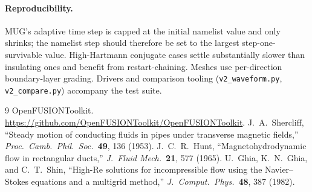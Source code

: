 \documentclass[11pt,letterpaper]{article}
\begin{document}
\paragraph{Reproducibility.} MUG's adaptive time step is capped at the initial
namelist value and only shrinks; the namelist step should therefore be set to the
largest step-one-survivable value. High-Hartmann conjugate cases settle
substantially slower than insulating ones and benefit from restart-chaining.
Meshes use per-direction boundary-layer grading. Drivers and comparison tooling
(\texttt{v2\_waveform.py}, \texttt{v2\_compare.py}) accompany the test suite.

\begin{thebibliography}{9}
 OpenFUSIONToolkit. \url{https://github.com/OpenFUSIONToolkit/OpenFUSIONToolkit}.
 J.~A.~Shercliff, ``Steady motion of conducting fluids in
pipes under transverse magnetic fields,'' \emph{Proc.\ Camb.\ Phil.\ Soc.}\ \textbf{49}, 136 (1953).
 J.~C.~R.~Hunt, ``Magnetohydrodynamic flow in rectangular ducts,''
\emph{J.\ Fluid Mech.}\ \textbf{21}, 577 (1965).
 U.~Ghia, K.~N.~Ghia, and C.~T.~Shin, ``High-Re solutions for
incompressible flow using the Navier--Stokes equations and a multigrid method,''
\emph{J.\ Comput.\ Phys.}\ \textbf{48}, 387 (1982).
\end{thebibliography}
\end{document}
